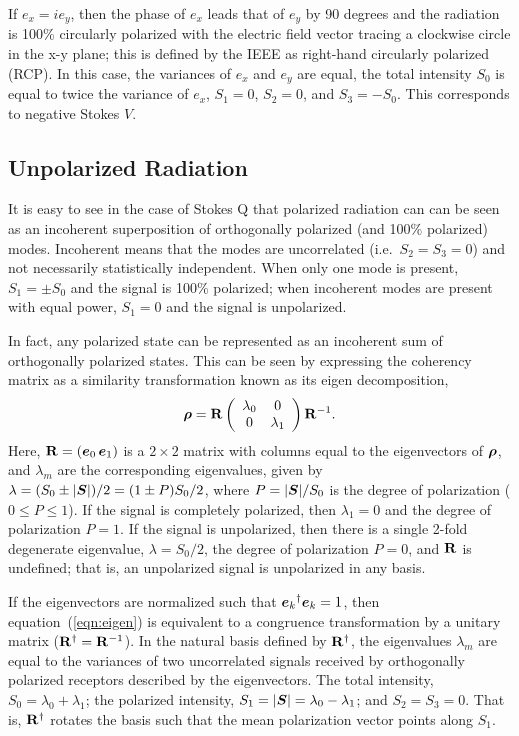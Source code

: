 \documentclass[twocolumn]{aastex6}
\newcommand{\mbf}[1]{\mbox{\boldmath $#1$}}
\newcommand{\eqn}[1]{equation~(\ref{eqn:#1})}
\begin{document}
If $e_x=i e_y$, then the phase of $e_x$ leads that of $e_y$ by 90
degrees and the radiation is 100\% circularly polarized with the electric
field vector tracing a clockwise circle in the x-y plane; this is
defined by the IEEE as right-hand circularly polarized (RCP).  In this
case, the variances of $e_x$ and $e_y$ are equal, the total intensity
$S_0$ is equal to twice the variance of $e_x$, $S_1=0$, $S_2=0$, and
$S_3=-S_0$.  This corresponds to negative Stokes $V$.

\subsection { Unpolarized Radiation }

It is easy to see in the case of Stokes Q that polarized radiation can
can be seen as an incoherent superposition of orthogonally polarized
(and 100\% polarized) modes.  Incoherent means that the modes are uncorrelated
(i.e.\ $S_2=S_3=0$) and not necessarily statistically independent.
When only one mode is present, $S_1 = \pm S_0$ and the signal is 100\%
polarized; when incoherent modes are present with equal power, $S_1=0$
and the signal is unpolarized.

In fact, any polarized state can be represented as an incoherent sum
of orthogonally polarized states.  This can be seen by expressing the
coherency matrix as a similarity transformation known as its eigen
decomposition,
%
\begin{equation}
\mbf{\rho}={\bf{R}}\left( \begin{array}{cc}
\lambda_0 & 0 \\
0 & \lambda_1
\end{array}\right){\bf{R}}^{-1}.
\label{eqn:eigen}
\end{equation}
Here, ${\bf{R}}=(\mbf{e}_0\,\mbf{e}_1)$ is a $2\times2$ matrix with
columns equal to the eigenvectors of $\mbf{\rho}$, and $\lambda_m$ are
the corresponding eigenvalues, given by
$\lambda=(S_0\pm|\mbf{S}|)/2=(1 \pm P)S_0/2$, where $P=|\mbf{S}|/S_0$
is the degree of polarization ($0\le P\le1$).  If the signal is
completely polarized, then $\lambda_1=0$ and the degree of
polarization $P=1$.  If the signal is unpolarized, then there is a
single 2-fold degenerate eigenvalue, $\lambda=S_0/2$, the degree of
polarization $P=0$, and ${\bf R}$ is undefined; that is, an
unpolarized signal is unpolarized in any basis.

If the eigenvectors are normalized such that
${\mbf{e}_k}^\dagger\mbf{e}_k=1$, then \eqn{eigen} is equivalent to a
congruence transformation by a unitary matrix (${\bf R}^\dagger={\bf
  R}^{-1}$).
%
In the natural basis defined by ${\bf{R}}^\dagger$, the eigenvalues
$\lambda_m$ are equal to the variances of two uncorrelated signals
received by orthogonally polarized receptors described by the
eigenvectors.
%
The total intensity, $S_0=\lambda_0+\lambda_1$; the
polarized intensity, $S_1=|\mbf{S}|=\lambda_0-\lambda_1$; and
$S_2=S_3=0$.  
%
That is, ${\bf{R}}^\dagger$ rotates the basis such that the mean
polarization vector points along $S_1$.
\end{document}
